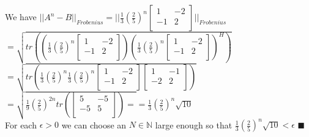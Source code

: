 \documentclass[letterpaper,12pt]{article}
\theoremstyle{definition}
\begin{document}
 We have  $||A^n-B||_{Frobenius} = || 
  \frac{1}{3}(\frac{2}{5})^n
  \begin{bmatrix}
   1 &  -2 \\
   -1 &  2\\
  \end{bmatrix}    ||_{Frobenius} $\\
  $= \sqrt{ tr\left(\left(\frac{1}{3}(\frac{2}{5})^n
  \begin{bmatrix}
   1 &  -2 \\
   -1 &  2\\
  \end{bmatrix}\right)\left( \frac{1}{3}(\frac{2}{5})^n
  \begin{bmatrix}
   1 &  -2 \\
   -1 &  2\\
  \end{bmatrix}  \right)^H  \right)}$\\
  $ = \sqrt{ tr\left(\frac{1}{3}(\frac{2}{5})^n\frac{1}{3}(\frac{2}{5})^n\begin{bmatrix}
   1 &  -2 \\
   -1 &  2\\
  \end{bmatrix}\begin{bmatrix}
   1 &  -1 \\
   -2 &  2\\
  \end{bmatrix}      \right) }$\\
  
  $ = \sqrt{\frac{1}{9}\left( \frac{2}{5}  \right)^{2n}tr\left(\begin{bmatrix}
   5 &  -5 \\
   -5 &  5\\
  \end{bmatrix}\right) =                                    } = \frac{1}{3}\left(\frac{2}{5}\right)^n\sqrt{10}$\\
  
  For each $\epsilon >0$ we can choose an $N\in \mathbb{N}$ large enough so that $\frac{1}{3}\left(\frac{2}{5}\right)^n\sqrt{10} < \epsilon$ \hfill $\blacksquare$\\
  
\end{document}
